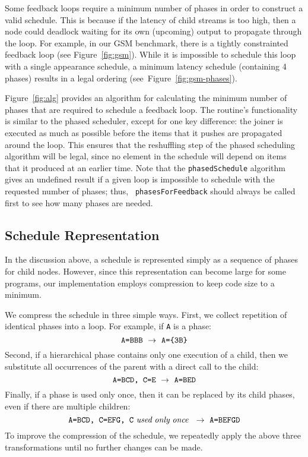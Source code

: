 Some feedback loops require a minimum number of phases in order to
construct a valid schedule.  This is because if the latency of child
streams is too high, then a node could deadlock waiting for its own
(upcoming) output to propagate through the loop.  For example, in our
GSM benchmark, there is a tightly constrainted feedback loop (see
Figure~\ref{fig:gsm}).  While it is impossible to schedule this loop
with a single appearance schedule, a minimum latency schedule
(containing 4 phases) results in a legal ordering
(see~Figure~\ref{fig:gsm-phases}).

Figure~\ref{fig:alg} provides an algorithm for calculating the minimum
number of phases that are required to schedule a feedback loop.  The
routine's functionality is similar to the phased scheduler, except for
one key difference: the joiner is executed as much as possible before
the items that it pushes are propagated around the loop.  This ensures
that the reshuffling step of the phased scheduling algorithm will be
legal, since no element in the schedule will depend on items that it
produced at an earlier time.  Note that the {\tt phasedSchedule}
algorithm gives an undefined result if a given loop is impossible to
schedule with the requested number of phases; thus, {\tt
phasesForFeedback} should always be called first to see how many
phases are needed.

\subsection{Schedule Representation}
\label{sec:schedrep}

In the discussion above, a schedule is represented simply as a
sequence of phases for child nodes.  However, since this
representation can become large for some programs, our implementation
employs compression to keep code size to a minimum.  

We compress the schedule in three simple ways.  First, we collect
repetition of identical phases into a loop.  For example, if {\tt A}
is a phase:
\[
\mbox{{\tt A=BBB}} ~\rightarrow~ \mbox{{\tt A=\{3B\}}}
\]
Second, if a hierarchical phase contains only one execution of a
child, then we substitute all occurrences of the parent with a direct
call to the child:
\[
\mbox{{\tt A=BCD, C=E}} ~\rightarrow~ \mbox{{\tt A=BED}}
\]
Finally, if a phase is used only once, then it can be replaced by its
child phases, even if there are multiple children:
\[
\mbox{{\tt A=BCD, C=EFG, C}}~\mbox{\it used}~\mbox{\it only}~\mbox{\it once}~ ~\rightarrow~ \mbox{{\tt A=BEFGD}}
\]
To improve the compression of the schedule, we repeatedly apply the
above three transformations until no further changes can be made.


